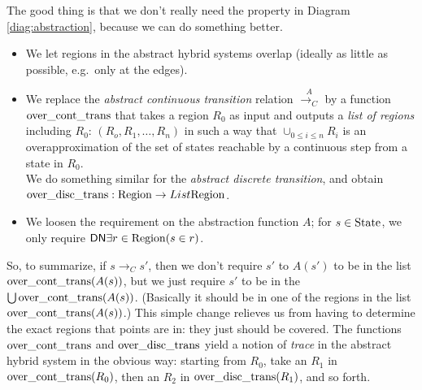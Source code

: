 \documentclass[runningheads]{llncs}
\newcommand{\weg}[1]{}
\newcommand{\DN}{{\sf DN}}
\newcommand{\State}{{\rm State}}
\newcommand{\Region}{{\rm Region}}
\newcommand{\contrans}{\rightarrow_C}
\newcommand{\acontrans}{\stackrel{A}{\rightarrow_C}}
\newcommand{\overcontrans}{{\rm over\_cont\_trans}}
\newcommand{\overdistrans}{{\rm over\_disc\_trans}}
\begin{document}
The good thing is that we don't really need the property in Diagram
\ref{diag:abstraction}, because we can do something better. 
\begin{itemize}
\item
We let regions in the abstract hybrid systems overlap (ideally as
little as possible, e.g.\ only at the edges).

\item
We replace the {\em abstract continuous transition\/} relation
$\acontrans$ by a function $\overcontrans$ that takes a region $R_0$
as input and outputs a {\em list of regions\/} including $R_0$: $(R_o,
R_1, \ldots, R_n)$ in such a way that $\cup_{0\leq i\leq n}R_i$ is an
overapproximation of the set of states reachable by a continuous step
from a state in $R_0$.\\
We do something similar for the {\em abstract discrete transition}, and obtain $\overdistrans :\Region \rightarrow List \Region$.
\item
We loosen the requirement on the abstraction function $A$; for $s \in \State$, we only require $\DN {\exists r\in \Region}{(s\in r)}$.
\end{itemize}

So, to summarize, if $s\contrans s'$, then we don't require $s'$ to
$A(s')$ to be in the list $\overcontrans(A(s))$, but we just require
$s'$ to be in the $\bigcup \overcontrans(A(s))$. (Basically it should
be in one of the regions in the list $\overcontrans(A(s))$.) This
simple change relieves us from having to determine the exact regions
that points are in: they just should be covered. The functions
$\overcontrans$ and $\overdistrans$ yield a notion of {\em trace\/} in the abstract
hybrid system in the obvious way: starting from $R_0$, take an $R_1$ in $\overcontrans( R_0)$, then an $R_2$ in $\overdistrans(R_1)$, and so forth.


\weg{
The abstraction method for verification of (concrete) hybrid system safety as we implement it can be summarized as follows:
\begin{enumerate}
\item build an abstract hybrid system corresponding to the concrete hybrid system;
\item 
\label{steptwo} 
show that each trace in the concrete system corresponds to some trace
in the abstract system (and as a corollary, that reachability in the
concrete system implies reachability in the abstract system, and most
importantly, that unreachability in the abstract system implies
unreachability in the concrete system);
\item 
\label{stepthree} 
run a certified graph reachability algorithm on the (finite, discrete)
abstract system to verify that no unsafe \emph{abstract} states are
reachable;
\item 
conclude from \ref{steptwo} and \ref{stepthree} that no unsafe
\emph{concrete} states are reachable either.
\end{enumerate}
}
\end{document}
